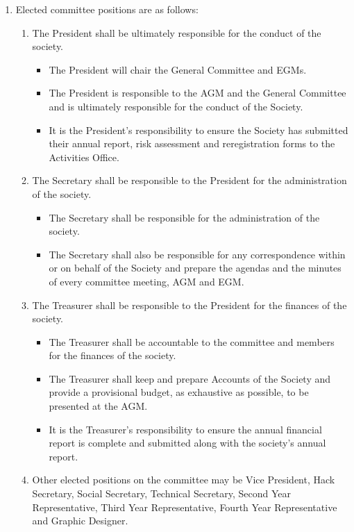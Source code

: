 \begin{enumerate}
\item Elected committee positions are as follows:
  \begin{enumerate}
  \item The President shall be ultimately responsible for the conduct of the society.
    \begin{itemize}
    \item The President will chair the General Committee and EGMs.
    \item The President is responsible to the AGM and the General Committee and is ultimately responsible for the conduct of the Society.
    \item It is the President's responsibility to ensure the Society has submitted their annual report, risk assessment and reregistration forms to the Activities Office.
    \end{itemize}
  \item The Secretary shall be responsible to the President for the administration of the society.
    \begin{itemize}
    \item The Secretary shall be responsible for the administration of the society.
    \item The Secretary shall also be responsible for any correspondence within or on behalf of the Society and prepare the agendas and the minutes of every committee meeting, AGM and EGM\@.
    \end{itemize}
  \item The Treasurer shall be responsible to the President for the finances of the society.
    \begin{itemize}
    \item The Treasurer shall be accountable to the committee and members for the finances of the society.
    \item The Treasurer shall keep and prepare Accounts of the Society and provide a provisional budget, as exhaustive as possible, to be presented at the AGM\@.
    \item It is the Treasurer's responsibility to ensure the annual financial report is complete and submitted along with the society's annual report.
    \end{itemize}
  \item Other elected positions on the committee may be Vice President, Hack Secretary, Social Secretary, Technical Secretary, Second Year Representative, Third Year Representative, Fourth Year Representative and Graphic Designer.
  \end{enumerate}


\end{enumerate}
